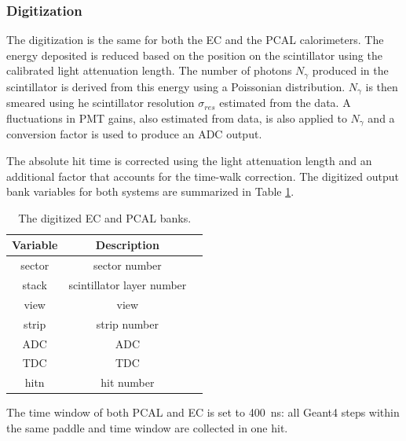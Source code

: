 \subsubsection{Digitization}
The digitization is the same for both the EC and the PCAL calorimeters.
The energy deposited is reduced based on the position on the scintillator using the calibrated light attenuation length.
The number of photons $N_\gamma$ produced in the scintillator is derived from this energy using a Poissonian distribution.
$N_\gamma$ is then smeared using he scintillator resolution $\sigma_{res}$ estimated from the data.
A fluctuations in PMT gains, also estimated from data, is also applied to $N_\gamma$ and a
conversion factor is used to produce an ADC output.

The absolute hit time is corrected using the light attenuation length and an additional factor
that accounts for the time-walk correction.
The digitized output bank variables for both systems are summarized in Table \ref{tab:ecBank}.

\begin{table}[h]
	\begin{center}
		\begin{tabular}{| c | c | c |}
			\hline \hline
			Variable &                Description   \\
			\hline
             sector  &              sector number   \\
              stack  &  scintillator layer number   \\
               view  &                       view   \\
              strip  &               strip number   \\
                ADC  &                        ADC   \\
                TDC  &                        TDC   \\
               hitn  &                 hit number   \\
			\hline \hline
		\end{tabular}
	\end{center}
	\caption{The digitized EC and PCAL banks.}\label{tab:ecBank}
\end{table}


The time window of both PCAL and EC is set to 400~ns: all Geant4 steps within the same paddle and time window are collected in one hit.
